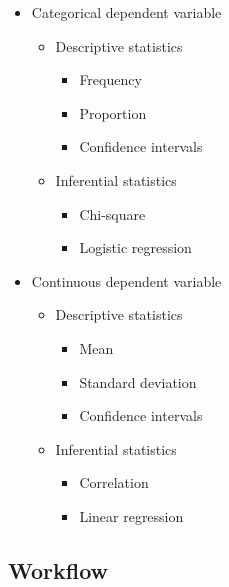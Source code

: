 \documentclass[
  letterpaper,
]{scrbook}
\providecommand{\tightlist}{%
  \setlength{\itemsep}{0pt}\setlength{\parskip}{0pt}}\usepackage{longtable,booktabs,array}
\begin{document}
\begin{itemize}
\tightlist
\item
  Categorical dependent variable

  \begin{itemize}
  \tightlist
  \item
    Descriptive statistics

    \begin{itemize}
    \tightlist
    \item
      Frequency
    \item
      Proportion
    \item
      Confidence intervals
    \end{itemize}
  \item
    Inferential statistics

    \begin{itemize}
    \tightlist
    \item
      Chi-square
    \item
      Logistic regression
    \end{itemize}
  \end{itemize}
\item
  Continuous dependent variable

  \begin{itemize}
  \tightlist
  \item
    Descriptive statistics

    \begin{itemize}
    \tightlist
    \item
      Mean
    \item
      Standard deviation
    \item
      Confidence intervals
    \end{itemize}
  \item
    Inferential statistics

    \begin{itemize}
    \tightlist
    \item
      Correlation
    \item
      Linear regression
    \end{itemize}
  \end{itemize}
\end{itemize}

\hypertarget{ida-workflow}{%
\subsection{Workflow}\label{ida-workflow}}
\end{document}
